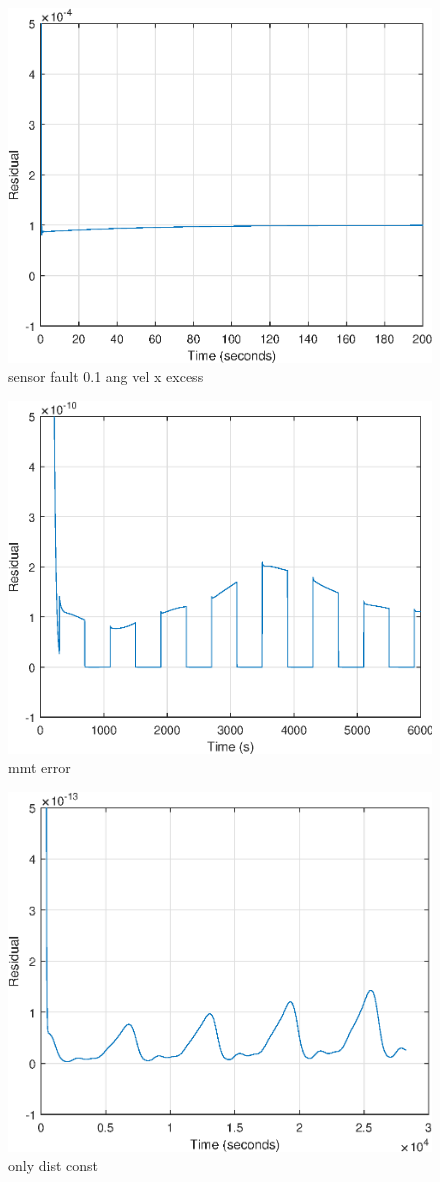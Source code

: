 \begin{figure}[H]
	\centering
	\includegraphics[width=0.7\linewidth]{figures/sensfault_res}
	\caption{sensor fault 0.1 ang vel x excess}
	\label{fig:}
\end{figure}

\begin{figure}[H]
	\centering
	\includegraphics[width=0.7\linewidth]{figures/mt_fault_res}
	\caption{mmt error}
	\label{fig:residualmt}
\end{figure}

\begin{figure}[H]
	\centering
	\includegraphics[width=0.7\linewidth]{figures/constdistonly_res}
	\caption{only dist const}
	\label{fig:residualdist}
\end{figure}

